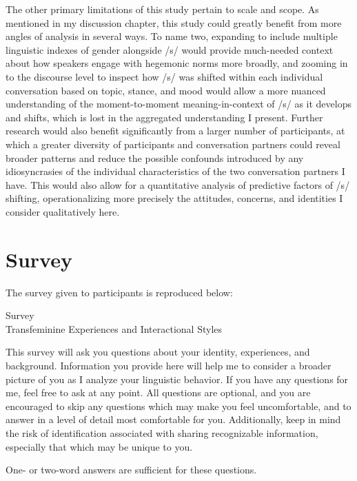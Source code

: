 \documentclass[12pt,twoside]{reedthesis}
\begin{document}
The other primary limitations of this study pertain to scale and scope. As mentioned in my discussion chapter, this study could greatly benefit from more angles of analysis in several ways. To name two, expanding to include multiple linguistic indexes of gender alongside /s/ would provide much-needed context about how speakers engage with hegemonic norms more broadly, and zooming in to the discourse level to inspect how /s/ was shifted within each individual conversation based on topic, stance, and mood would allow a more nuanced understanding of the moment-to-moment meaning-in-context of /s/ as it develops and shifts, which is lost in the aggregated understanding I present. Further research would also benefit significantly from a larger number of participants, at which a greater diversity of participants and conversation partners could reveal broader patterns and reduce the possible confounds introduced by any idiosyncrasies of the individual characteristics of the two conversation partners I have. This would also allow for a quantitative analysis of predictive factors of /s/ shifting, operationalizing more precisely the attitudes, concerns, and identities I consider qualitatively here.


    \appendix
\chapter{Survey} \label{appendix_a}
The survey given to participants is reproduced below:

\begin{centering}Survey \\
Transfeminine Experiences and Interactional Styles \\
\end{centering}
This survey will ask you questions about your identity, experiences, and background. Information you provide here will help me to consider a broader picture of you as I analyze your linguistic behavior. If you have any questions for me, feel free to ask at any point. All questions are optional, and you are encouraged to skip any questions which may make you feel uncomfortable, and to answer in a level of detail most comfortable for you. Additionally, keep in mind the risk of identification associated with sharing recognizable information, especially that which may be unique to you.

 One- or two-word answers are sufficient for these questions.
\end{document}
